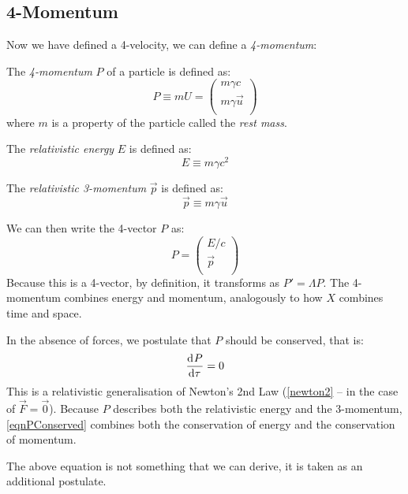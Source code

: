 \documentclass[../main.tex]{subfiles}
\begin{document}
\subsection{4-Momentum}
Now we have defined a 4-velocity, we can define a \textit{4-momentum}:
\begin{definition}[4-Momentum]
  The \textit{4-momentum} $P$ of a particle is defined as:
  \[
    P \equiv mU = \begin{pmatrix}
    m\gamma c \\
    m\gamma \vec{u} \\
    \end{pmatrix}
  \]
  where $m$ is a property of the particle called the \textit{rest mass}.
\end{definition}
\begin{definition}
  The \textit{relativistic energy} $E$ is defined as:
  \[
    E \equiv m\gamma c^2
  \]
\end{definition}
\begin{definition}
  The \textit{relativistic 3-momentum} $\vec{p}$ is defined as:
  \[
    \vec{p} \equiv m\gamma \vec{u}
  \]
\end{definition}
We can then write the 4-vector $P$ as:
\begin{equation}
  P = \begin{pmatrix}
  E/c \\
  \vec{p} \\
  \end{pmatrix} \label{pEoverC}
\end{equation}
Because this is a 4-vector, by definition, it transforms as $P' = \Lambda P$.
The 4-momentum combines energy and momentum, analogously to how $X$ combines time and space.

In the absence of forces, we postulate that $P$ should be conserved, that is:
\begin{equation}
  \deriv{P}{\tau} = 0 \label{eqnPConserved}
\end{equation}
This is a relativistic generalisation of Newton's 2nd Law (\cref{newton2} -- in the case of $\vec{F} = \vec{0}$).
Because $P$ describes both the relativistic energy and the 3-momentum, \cref{eqnPConserved} combines both the conservation of energy and the conservation of momentum.
\begin{remark}[Note]
  The above equation is not something that we can derive, it is taken as an additional postulate.
\end{remark}
\end{document}
